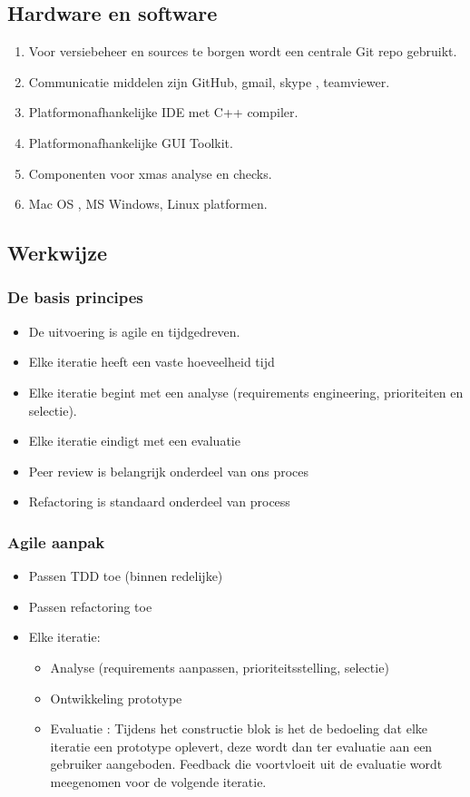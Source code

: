\subsection{Hardware en software}
\begin{enumerate}
	\item Voor versiebeheer en sources te borgen wordt een centrale Git repo gebruikt.
	\item Communicatie middelen zijn GitHub, gmail, skype , teamviewer.
	\item Platformonafhankelijke IDE met C++ compiler.
	\item Platformonafhankelijke GUI Toolkit.
	\item Componenten voor xmas analyse en checks.
	\item Mac OS , MS Windows, Linux platformen.
\end{enumerate}


\subsection{Werkwijze}
\subsubsection{De basis principes}
\begin{itemize}
 \item De uitvoering is agile en tijdgedreven.
 \item Elke iteratie heeft een vaste hoeveelheid tijd
 \item Elke iteratie begint met een analyse (requirements engineering, prioriteiten en selectie).     \item Elke iteratie eindigt met een evaluatie
\item Peer review is belangrijk onderdeel van ons proces
 \item Refactoring is standaard onderdeel van process
\end{itemize}

\subsubsection{Agile aanpak}
\begin{itemize}
 \item Passen TDD toe (binnen redelijke)
 \item Passen refactoring toe
 \item Elke iteratie:
 \begin{itemize}
   \item Analyse (requirements aanpassen, prioriteitsstelling, selectie)
   \item Ontwikkeling prototype
   \item Evaluatie : Tijdens het constructie blok is het de bedoeling dat elke iteratie een prototype oplevert, deze wordt dan ter evaluatie aan een gebruiker aangeboden. Feedback die voortvloeit uit de evaluatie wordt meegenomen voor de volgende iteratie.
 \end{itemize}
\end{itemize}



